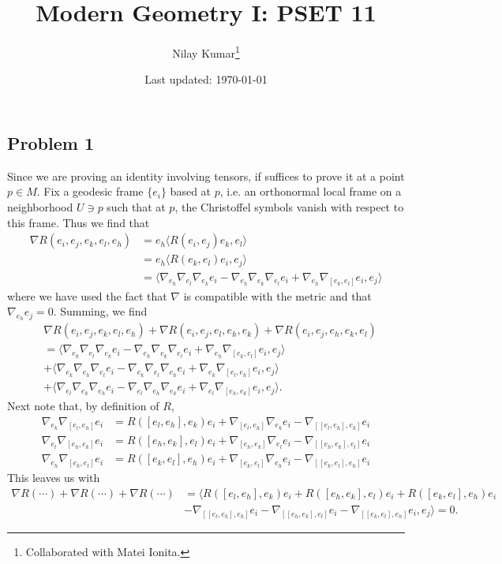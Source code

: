 \documentclass{../mathnotes}
\title{Modern Geometry I: PSET 11}
\author{Nilay Kumar\footnote{Collaborated with Matei Ionita.}}
\date{Last updated: \today}
\begin{document}
\maketitle

\subsection*{Problem 1}
Since we are proving an identity involving tensors, if suffices to prove it
at a point $p\in M$. Fix a geodesic frame $\{e_i\}$ based at $p$, i.e. an
orthonormal local frame on a neighborhood $U\ni p$ such that at $p$, the
Christoffel symbols vanish with respect to this frame. Thus we find that
\begin{align*}
    \nabla R\left( e_i,e_j,e_k,e_l,e_h \right) &= e_h\langle R(e_i,e_j)e_k,e_l\rangle\\
    &= e_h\langle R(e_k,e_l)e_i,e_j\rangle\\
    &= \langle \nabla_{e_h}\nabla_{e_l}\nabla_{e_k}e_i-\nabla_{e_h}\nabla_{e_k}\nabla_{e_l}e_i+\nabla_{e_h}\nabla_{[e_k,e_l]}e_i,e_j\rangle
\end{align*}
where we have used the fact that $\nabla$ is compatible with the metric and
that $\nabla_{e_h}e_j=0$.
Summing, we find
\begin{align*}
    &\nabla R(e_i,e_j,e_k,e_l,e_h)+\nabla R(e_i,e_j,e_l,e_h,e_k)+\nabla R(e_i,e_j,e_h,e_k,e_l)\\
    &= \langle\nabla_{e_h}\nabla_{e_l}\nabla_{e_k}e_i-\nabla_{e_h}\nabla_{e_k}\nabla_{e_l}e_i+\nabla_{e_h}\nabla_{[e_k,e_l]}e_i,e_j\rangle\\
    &+ \langle\nabla_{e_k}\nabla_{e_h}\nabla_{e_l}e_i-\nabla_{e_k}\nabla_{e_l}\nabla_{e_h}e_i+\nabla_{e_k}\nabla_{[e_l,e_h]}e_i,e_j\rangle\\
    &+ \langle\nabla_{e_l}\nabla_{e_k}\nabla_{e_h}e_i-\nabla_{e_l}\nabla_{e_h}\nabla_{e_k}e_i+\nabla_{e_l}\nabla_{[e_h,e_k]}e_i,e_j\rangle.
\end{align*}
Next note that, by definition of $R$,
\begin{align*}
    \nabla_{e_k}\nabla_{[e_l,e_h]}e_i&=R([e_l,e_h],e_k)e_i+\nabla_{[e_l,e_h]}\nabla_{e_k}e_i-\nabla_{[ [e_l,e_h],e_k ]}e_i\\
    \nabla_{e_l}\nabla_{[e_h,e_k]}e_i&=R([e_h,e_k],e_l)e_i+\nabla_{[e_h,e_k]}\nabla_{e_l}e_i-\nabla_{[  [e_h,e_k],e_l]}e_i\\
    \nabla_{e_h}\nabla_{[e_k,e_l]}e_i&=R([e_k,e_l],e_h)e_i+\nabla_{[e_k,e_l]}\nabla_{e_h}e_i-\nabla_{[  [e_k,e_l],e_h]}e_i
\end{align*}
This leaves us with
\begin{align*}
    \nabla R(\cdots)+\nabla R(\cdots) + \nabla R(\cdots) &= \langle R([e_l,e_h],e_k)e_i+R([e_h,e_k],e_l)e_i+R([e_k,e_l],e_h)e_i\\
    &-\nabla_{[ [e_l,e_h],e_k ]}e_i-\nabla_{[  [e_h,e_k],e_l]}e_i-\nabla_{[  [e_k,e_l],e_h]}e_i, e_j\rangle=0.
\end{align*}
\end{document}
